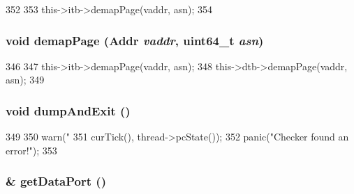 \begin{DoxyCode}
352     {
353         this->itb->demapPage(vaddr, asn);
354     }
\end{DoxyCode}
\hypertarget{classCheckerCPU_a2d698ff909513b48a1263f8a5440e067}{
\subsubsection[{demapPage}]{\setlength{\rightskip}{0pt plus 5cm}void demapPage ({\bf Addr} {\em vaddr}, \/  uint64\_\-t {\em asn})}}
\label{classCheckerCPU_a2d698ff909513b48a1263f8a5440e067}



\begin{DoxyCode}
346     {
347         this->itb->demapPage(vaddr, asn);
348         this->dtb->demapPage(vaddr, asn);
349     }
\end{DoxyCode}
\hypertarget{classCheckerCPU_a516e77319e399949d9137957cd9970d0}{
\subsubsection[{dumpAndExit}]{\setlength{\rightskip}{0pt plus 5cm}void dumpAndExit ()}}
\label{classCheckerCPU_a516e77319e399949d9137957cd9970d0}



\begin{DoxyCode}
349 {
350     warn("%
351          curTick(), thread->pcState());
352     panic("Checker found an error!");
353 }
\end{DoxyCode}
\hypertarget{classCheckerCPU_a041a57fcad534c1bed3702a0f8f3a6b1}{
\subsubsection[{getDataPort}]{\& getDataPort ()}}
\label{classCheckerCPU_a041a57fcad534c1bed3702a0f8f3a6b1}



